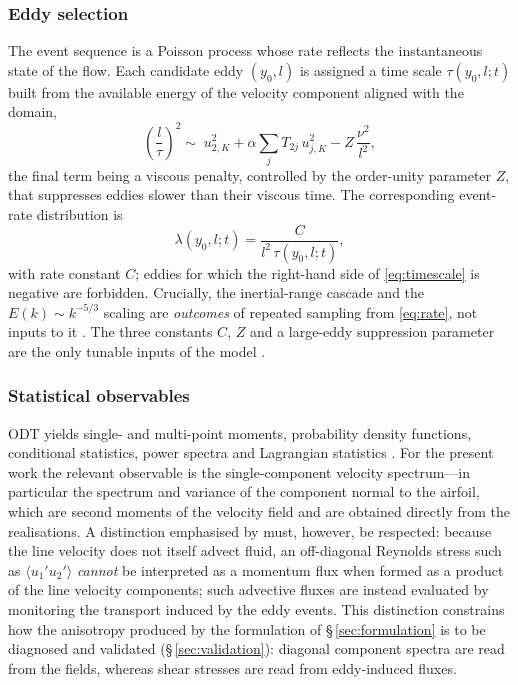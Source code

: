 \documentclass[lineno]{JFM-FLM_Au}
\begin{document}
\subsubsection{Eddy selection}

The event sequence is a Poisson process whose rate reflects the
instantaneous state of the flow. Each candidate eddy $(y_0,l)$ is assigned
a time scale $\tau(y_0,l;t)$ built from the available energy of the
velocity component aligned with the domain,
\begin{equation}
  \left(\frac{l}{\tau}\right)^{2}
  \sim\; u_{2,K}^2+\alpha\sum_j T_{2j}\,u_{j,K}^2-Z\,\frac{\nu^2}{l^2},
  \label{eq:timescale}
\end{equation}
the final term being a viscous penalty, controlled by the order-unity
parameter $Z$, that suppresses eddies slower than their viscous time. The
corresponding event-rate distribution is
\begin{equation}
  \lambda(y_0,l;t)=\frac{C}{l^2\,\tau(y_0,l;t)},
  \label{eq:rate}
\end{equation}
with rate constant $C$; eddies for which the right-hand side of
\eqref{eq:timescale} is negative are forbidden. Crucially, the
inertial-range cascade and the $E(k)\sim k^{-5/3}$ scaling are
\emph{outcomes} of repeated sampling from \eqref{eq:rate}, not inputs to
it \citep{Kerstein1999}. The three constants $C$, $Z$ and a large-eddy
suppression parameter are the only tunable inputs of the model
\citep{StephensLignell2021}.

\subsubsection{Statistical observables}\label{sec:observables}

ODT yields single- and multi-point moments, probability density functions,
conditional statistics, power spectra and Lagrangian statistics
\citep{Kerstein1999}. For the present work the relevant observable is the
single-component velocity spectrum---in particular the spectrum and
variance of the component normal to the airfoil, which are second moments
of the velocity field and are obtained directly from the realisations. A
distinction emphasised by \citet{Kerstein2001} must, however, be respected:
because the line velocity does not itself advect fluid, an off-diagonal
Reynolds stress such as $\langle u_1' u_2'\rangle$ \emph{cannot} be
interpreted as a momentum flux when formed as a product of the line
velocity components; such advective fluxes are instead evaluated by
monitoring the transport induced by the eddy events. This distinction
constrains how the anisotropy produced by the formulation of
\S\,\ref{sec:formulation} is to be diagnosed and validated
(\S\,\ref{sec:validation}): diagonal component spectra are read from the
fields, whereas shear stresses are read from eddy-induced fluxes.
\end{document}
